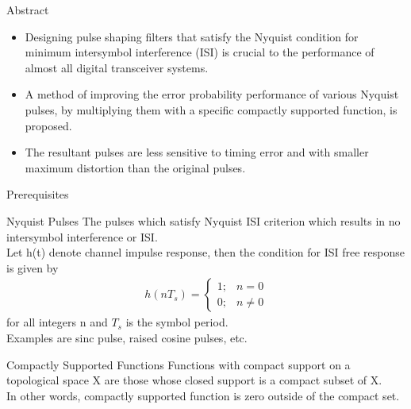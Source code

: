 \documentclass[10pt]{beamer}
\begin{document}
\begin{frame}
\begin{block}{Abstract}
\begin{itemize}
\item Designing pulse shaping filters that satisfy the
Nyquist condition for minimum intersymbol interference (ISI) is
crucial to the performance of almost all digital transceiver
systems. 


\item A method of improving the error probability performance of various Nyquist pulses, by multiplying them with a specific compactly supported function, is proposed.


\item The resultant pulses are less sensitive to timing error and with smaller maximum distortion than the original pulses.




\end{itemize}
\end{block}


\end{frame}
\begin{frame}{Prerequisites}
\begin{block}{Nyquist Pulses}
The pulses which satisfy Nyquist ISI criterion which results in no intersymbol interference or ISI.\\
Let h(t) denote channel impulse response, then the condition for ISI free response is given by
 \begin{align}
 h(nT_{s})= \left\{
  \begin{array}{lr} 
      1; & n=0 \\
      0; & n\neq 0 
      \end{array}
\right.
\end{align}
for all integers n and $T_{s}$ is the symbol period.\\
Examples are sinc pulse, raised cosine pulses, etc. 
\end{block}
\begin{block}{Compactly Supported Functions}
Functions with compact support on a topological space X are those whose closed support is a compact subset of X.
\\In other words, compactly supported function is zero outside of the compact set.

\end{block}
\end{frame}
\end{document}
